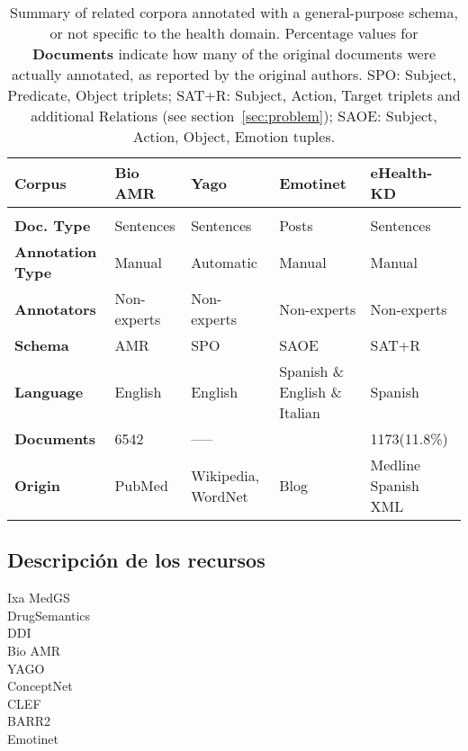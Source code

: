     \begin{table}[h!]\centering
    \footnotesize{
    \begin{tabularx}{\hsize}{X|XXXX}
        \hline
        \hline
      \textbf{Corpus} & \textbf{Bio AMR} & \textbf{Yago} & \textbf{Emotinet} & \textbf{eHealth-KD} \\
        \hline \\
      \textbf{Doc. Type} & Sentences & Sentences & Posts & Sentences\\
        \textbf{Annotation Type} & Manual & Automatic & Manual & Manual \\
        \textbf{Annotators} & Non-experts & Non-experts & Non-experts & Non-experts \\
        \textbf{Schema} & AMR & {SPO} & {SAOE} & {SAT+R} \\ %
        \textbf{Language} & English & English & Spanish \& English \& Italian & Spanish \\
        \textbf{Documents}  & 6542 &  ----- &  & 1173(11.8\%) \\
        \textbf{Origin} & PubMed & Wikipedia, WordNet & Blog & Medline Spanish XML\\
        \hline
        \hline
    \end{tabularx}
    }
    \caption{Summary of related corpora annotated with a general-purpose schema, or not specific to the health domain.
    {Percentage values for \textbf{Documents} indicate how many of the original documents were actually annotated, as reported by the original authors. SPO: Subject, Predicate, Object triplets; SAT+R: Subject, Action, Target triplets and additional Relations (see section~\ref{sec:problem}); SAOE:  Subject, Action, Object, Emotion tuples.}%
    \label{tab:stateofart2}}
    \end{table}

\subsection{Descripción de los recursos}

  \begin{description}
  \item[Ixa MedGS]
  \item[DrugSemantics]
  \item[DDI]
  \item[Bio AMR]
  \item[YAGO]
  \item[ConceptNet]
  \item[CLEF]
  \item[BARR2]
\item[Emotinet]
\end{description}

